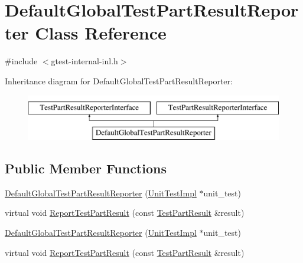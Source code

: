\hypertarget{classtesting_1_1internal_1_1DefaultGlobalTestPartResultReporter}{\section{\-Default\-Global\-Test\-Part\-Result\-Reporter \-Class \-Reference}
\label{d1/d1c/classtesting_1_1internal_1_1DefaultGlobalTestPartResultReporter}
}


{\ttfamily \#include $<$gtest-\/internal-\/inl.\-h$>$}

\-Inheritance diagram for \-Default\-Global\-Test\-Part\-Result\-Reporter\-:\begin{figure}[H]
\begin{center}
\leavevmode
\includegraphics[height=2.000000cm]{d1/d1c/classtesting_1_1internal_1_1DefaultGlobalTestPartResultReporter}
\end{center}
\end{figure}
\subsection*{\-Public \-Member \-Functions}
\begin{DoxyCompactItemize}
\item 
\hyperlink{classtesting_1_1internal_1_1DefaultGlobalTestPartResultReporter_af6608da1bb27c0d120ff1683800e1e82}{\-Default\-Global\-Test\-Part\-Result\-Reporter} (\hyperlink{classtesting_1_1internal_1_1UnitTestImpl}{\-Unit\-Test\-Impl} $\ast$unit\-\_\-test)
\item 
virtual void \hyperlink{classtesting_1_1internal_1_1DefaultGlobalTestPartResultReporter_acd54d55b39f168c91b6370be62cef448}{\-Report\-Test\-Part\-Result} (const \hyperlink{classtesting_1_1TestPartResult}{\-Test\-Part\-Result} \&result)
\item 
\hyperlink{classtesting_1_1internal_1_1DefaultGlobalTestPartResultReporter_af6608da1bb27c0d120ff1683800e1e82}{\-Default\-Global\-Test\-Part\-Result\-Reporter} (\hyperlink{classtesting_1_1internal_1_1UnitTestImpl}{\-Unit\-Test\-Impl} $\ast$unit\-\_\-test)
\item 
virtual void \hyperlink{classtesting_1_1internal_1_1DefaultGlobalTestPartResultReporter_a8662b990bc0a42bbe9fba3cded22d79e}{\-Report\-Test\-Part\-Result} (const \hyperlink{classtesting_1_1TestPartResult}{\-Test\-Part\-Result} \&result)
\end{DoxyCompactItemize}
